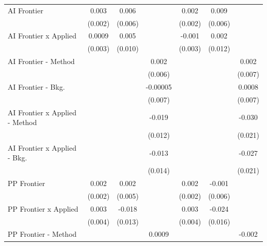 \begin{tabular}{lcccccc}
   AI Frontier                    & 0.003         & 0.006        &          & 0.002          & 0.009        &   \\   
                                  & (0.002)       & (0.006)      &          & (0.002)        & (0.006)      &   \\   
   AI Frontier x Applied          & 0.0009        & 0.005        &          & -0.001         & 0.002        &   \\   
                                  & (0.003)       & (0.010)      &          & (0.003)        & (0.012)      &   \\   
   AI Frontier - Method           &               &              & 0.002    &                &              & 0.002\\   
                                  &               &              & (0.006)  &                &              & (0.007)\\   
   AI Frontier - Bkg.             &               &              & -0.00005 &                &              & 0.0008\\   
                                  &               &              & (0.007)  &                &              & (0.007)\\   
   AI Frontier x Applied - Method &               &              & -0.019   &                &              & -0.030\\   
                                  &               &              & (0.012)  &                &              & (0.021)\\   
   AI Frontier x Applied - Bkg.   &               &              & -0.013   &                &              & -0.027\\   
                                  &               &              & (0.014)  &                &              & (0.021)\\   
   PP Frontier                    & 0.002         & 0.002        &          & 0.002          & -0.001       &   \\   
                                  & (0.002)       & (0.005)      &          & (0.002)        & (0.006)      &   \\   
   PP Frontier x Applied          & 0.003         & -0.018       &          & 0.003          & -0.024       &   \\   
                                  & (0.004)       & (0.013)      &          & (0.004)        & (0.016)      &   \\   
   PP Frontier - Method           &               &              & 0.0009   &                &              & -0.002\\   

\end{tabular}
